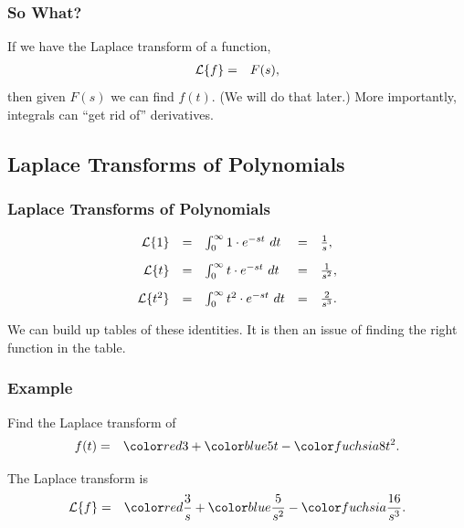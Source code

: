 \begin{frame}
  \frametitle{So What?}

  If we have the Laplace transform of a function, 
  \begin{eqnarray*}
    \laplace{f} & = & F(s),
  \end{eqnarray*}
  then given $F(s)$ we can find $f(t)$. (We will do that later.) More
  importantly, integrals can ``get rid of'' derivatives.

\end{frame}

\subsection{Laplace Transforms of Polynomials}

\begin{frame}
  \frametitle{Laplace Transforms of Polynomials}

  \begin{eqnarray*}
    \begin{array}{rcl@{\hspace{1em}}c@{\hspace{1em}}l}
    \laplace{1} & = & \int^\infty_0 1 \cdot e^{-st} ~ dt
    & = & \frac{1}{s}, \\ [10pt]
    \laplace{t} & = & \int^\infty_0 t \cdot e^{-st} ~ dt
    & = & \frac{1}{s^2}, \\ [10pt]
    \laplace{t^2} & = & \int^\infty_0 t^2 \cdot e^{-st} ~ dt
    & = & \frac{2}{s^3}.      
    \end{array}
  \end{eqnarray*}

  {%
    We can build up tables of these identities. It is then an issue of
    finding the right function in the table.
  }

\end{frame}


\begin{frame}
  \frametitle{Example}

  Find the Laplace transform of 
  \begin{eqnarray*}
    f(t) & = & \redText{3} + \blueText{5t} - \fuchsiaText{8t^2}.
  \end{eqnarray*}

  {
    
    The Laplace transform is
    \begin{eqnarray*}
      \laplace{f} & = & \redText{\frac{3}{s}} + \blueText{\frac{5}{s^2}} - \fuchsiaText{\frac{16}{s^3}}.
    \end{eqnarray*}

  }

\end{frame}

